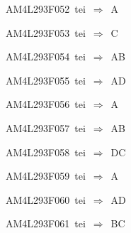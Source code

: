 {\sixrm AM4L293F052\ {\sixit tei}\ }$\Rightarrow$\ A\par\smallskip
{\sixrm AM4L293F053\ {\sixit tei}\ }$\Rightarrow$\ C\par\smallskip
{\sixrm AM4L293F054\ {\sixit tei}\ }$\Rightarrow$\ AB\par\smallskip
{\sixrm AM4L293F055\ {\sixit tei}\ }$\Rightarrow$\ AD\par\smallskip
{\sixrm AM4L293F056\ {\sixit tei}\ }$\Rightarrow$\ A\par\smallskip
{\sixrm AM4L293F057\ {\sixit tei}\ }$\Rightarrow$\ AB\par\smallskip
{\sixrm AM4L293F058\ {\sixit tei}\ }$\Rightarrow$\ DC\par\smallskip
{\sixrm AM4L293F059\ {\sixit tei}\ }$\Rightarrow$\ A\par\smallskip
{\sixrm AM4L293F060\ {\sixit tei}\ }$\Rightarrow$\ AD\par\smallskip
{\sixrm AM4L293F061\ {\sixit tei}\ }$\Rightarrow$\ BC\par\smallskip

